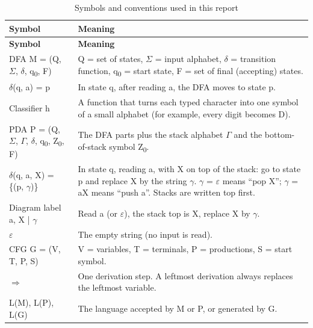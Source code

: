 \documentclass[12pt,a4paper]{article}
\begin{document}
{\small
\begin{longtable}{|>{\raggedright\arraybackslash}p{}|>{\raggedright\arraybackslash}p{}|}
\caption[Symbols and conventions used in this report]{Symbols and conventions used in this report}\label{tab:notation}\\
\hline
\rowcolor{hdr}\textbf{Symbol} & \textbf{Meaning}\\ \hline
\endfirsthead
\hline
\rowcolor{hdr}\textbf{Symbol} & \textbf{Meaning}\\ \hline
\endhead
DFA  M = (Q, \ensuremath{\Sigma}, \ensuremath{\delta}, q\textsubscript{0}, F) & Q = set of states, \ensuremath{\Sigma} = input alphabet, \ensuremath{\delta} = transition function, q\textsubscript{0} = start state, F = set of final (accepting) states.\\ \hline
\ensuremath{\delta}(q, a) = p & In state q, after reading a, the DFA moves to state p.\\ \hline
Classifier h & A function that turns each typed character into one symbol of a small alphabet (for example, every digit becomes D).\\ \hline
PDA  P = (Q, \ensuremath{\Sigma}, \ensuremath{\Gamma}, \ensuremath{\delta}, q\textsubscript{0}, Z\textsubscript{0}, F) & The DFA parts plus the stack alphabet \ensuremath{\Gamma} and the bottom-of-stack symbol Z\textsubscript{0}.\\ \hline
\ensuremath{\delta}(q, a, X) = \{(p, \ensuremath{\gamma})\} & In state q, reading a, with X on top of the stack: go to state p and replace X by the string \ensuremath{\gamma}. \ensuremath{\gamma} = \ensuremath{\varepsilon} means ``pop X''; \ensuremath{\gamma} = aX means ``push a''. Stacks are written top first.\\ \hline
Diagram label  a, X | \ensuremath{\gamma} & Read a (or \ensuremath{\varepsilon}), the stack top is X, replace X by \ensuremath{\gamma}.\\ \hline
\ensuremath{\varepsilon} & The empty string (no input is read).\\ \hline
CFG  G = (V, T, P, S) & V = variables, T = terminals, P = productions, S = start symbol.\\ \hline
\ensuremath{\Rightarrow} & One derivation step. A leftmost derivation always replaces the leftmost variable.\\ \hline
L(M), L(P), L(G) & The language accepted by M or P, or generated by G.\\ \hline

\end{longtable}}
\end{document}
